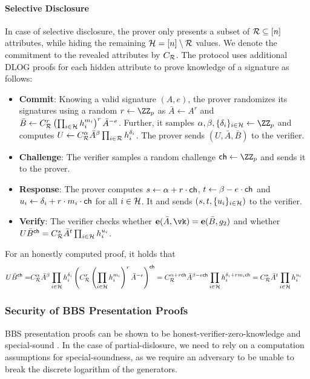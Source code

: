 \paragraph{Selective Disclosure}{
    In case of selective disclosure, the prover only presents a subset of $\mathcal{R}\subseteq[n]$ attributes, while hiding the remaining $\mathcal{H}=[n]\setminus\mathcal{R}$ values. We denote the commitment to the revealed attributes by $C_{\mathcal{R}}$. The protocol uses additional DLOG proofs for each hidden attribute to prove knowledge of a signature as follows:
    \begin{itemize}
        \item \textbf{Commit}: Knowing a valid signature $(A,e)$, the prover randomizes its signatures using a random $r\gets \ZZ_p$ as $\bar{A} \gets A^r$ and $\bar{B} \gets C_{\mathcal{R}}^r\left(\prod_{i\in\mathcal{H}}h_i^{m_i}\right)^r \bar{A}^{-e}$. Further, it samples $\alpha,\beta,\{\delta_i\}_{i\in\hidden}\gets \ZZ_p$ and computes $U \gets C_{\mathcal{R}}^{\alpha} \bar{A}^{\beta}\prod_{i\in\mathcal{R}}h_i^{\delta_i}$. The prover sends $(U,\bar{A},\bar{B})$ to the verifier.
        \item \textbf{Challenge}: The verifier samples a random challenge $\chall\gets \ZZ_p$ and sends it to the prover.
        \item \textbf{Response}: The prover computes $s\gets \alpha +r\cdot \mathsf{ch}$, $t\gets\beta-e\cdot \mathsf{ch}$ and $u_i\gets \delta_i+r\cdot m_i\cdot \mathsf{ch}$ for all $i\in\mathcal{H}$. It and sends $(s,t,\{u_i\}_{i\in\mathcal{H}})$ to the verifier.
        \item \textbf{Verify}: The verifier checks whether $\pairing(\bar{A},\vk) = \pairing(\bar{B},g_2)$ and whether $U \bar{B}^{\mathsf{ch}} = C_{\mathcal{R}}^s \bar{A}^t\prod_{i\in\mathcal{H}}h_i^{u_i}$.
    \end{itemize}
    For an honestly computed proof, it holds that 
    \begin{align*}
        U \bar{B}^{\mathsf{ch}}
        =& C_{\mathcal{R}}^{\alpha} \bar{A}^{\beta} \prod_{i\in\mathcal{H}}h_i^{\delta_i} \left(C_{\mathcal{R}}^r\left(\prod_{i\in\mathcal{H}}h_i^{m_i}\right)^r\bar{A}^{-e}\right)^{\mathsf{ch}}
        = C_{\mathcal{R}}^{\alpha + r \mathsf{ch}} \bar{A}^{\beta - e \mathsf{ch}} \prod_{i\in\mathcal{H}}h_i^{\delta_i+ r m_i \mathsf{ch}} 
        = C_{\mathcal{R}}^s \bar{A}^t \prod_{i\in\mathcal{H}}h_i^{u_i}  
    \end{align*}
}


\subsubsection{Security of BBS Presentation Proofs} \label{sec:prelims:bbs_pres_sec}
BBS presentation proofs can be shown to be honest-verifier-zero-knowledge and special-sound \cite{DBLP:conf/eurocrypt/TessaroZ23a}. In the case of partial-dislosure, we need to rely on a computation assumptions for special-soundness, as we require an adversary to be unable to break the discrete logarithm of the generators.
